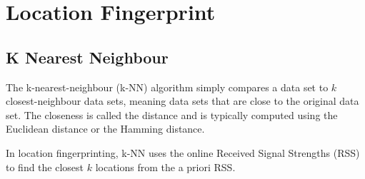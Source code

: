 
\section{Location Fingerprint}

  \subsection{K Nearest Neighbour}

  The k-nearest-neighbour (k-NN) algorithm simply compares a data set to $k$ closest-neighbour data sets, meaning data sets that are close to the original data set. The closeness is called the distance and is typically computed using the Euclidean distance or the Hamming distance.\cite{Liu2007, wiki_knn}

  In location fingerprinting, k-NN uses the online Received Signal Strengths (RSS) to find the closest $k$ locations from the a priori RSS.
